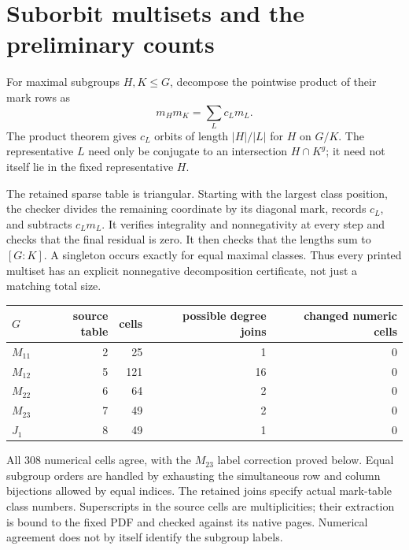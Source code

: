 \documentclass[11pt]{article}
\begin{document}
\section{Suborbit multisets and the preliminary counts}
For maximal subgroups $H,K\leq G$, decompose the pointwise product of their
mark rows as
\[
                 m_Hm_K=\sum_L c_Lm_L.
\]
The product theorem gives $c_L$ orbits of length $|H|/|L|$ for $H$ on
$G/K$. The representative $L$ need only be conjugate to an intersection
$H\cap K^g$; it need not itself lie in the fixed representative $H$.

The retained sparse table is triangular. Starting with the largest class
position, the checker divides the remaining coordinate by its diagonal
mark, records $c_L$, and subtracts $c_Lm_L$. It verifies integrality and
nonnegativity at every step and checks that the final residual is zero.
It then checks that the lengths sum to $[G:K]$. A singleton occurs exactly
for equal maximal classes. Thus every printed multiset has an explicit
nonnegative decomposition certificate, not just a matching total size.

\begin{center}\small
\begin{tabular}{lrrrr}
\toprule
$G$ & source table & cells & possible degree joins & changed numeric cells\\
\midrule
$M_{11}$ & 2 & 25 & 1 & 0\\
$M_{12}$ & 5 & 121 & 16 & 0\\
$M_{22}$ & 6 & 64 & 2 & 0\\
$M_{23}$ & 7 & 49 & 2 & 0\\
$J_1$ & 8 & 49 & 1 & 0\\
\bottomrule
\end{tabular}
\end{center}
All 308 numerical cells agree, with the $M_{23}$ label correction proved
below. Equal subgroup orders are handled by exhausting the simultaneous
row and column bijections allowed by equal indices. The retained joins
specify actual mark-table class numbers. Superscripts in the source cells
are multiplicities; their extraction is bound to the fixed PDF and checked
against its native pages. Numerical agreement does not by itself identify
the subgroup labels.
\end{document}
